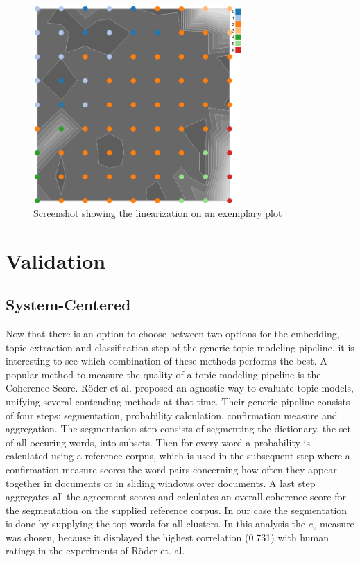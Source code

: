 \begin{figure}[t]
	\centering
	\includegraphics[width=300px]{../chapters/validation/pics/linearization}
	\caption{\label{pic:linearization} Screenshot showing the linearization on an exemplary plot}
\end{figure}

\section{Validation}

\subsection{System-Centered}

Now that there is an option to choose between two options for the embedding, topic extraction and classification step of the generic topic modeling pipeline, it is interesting to see which combination of these methods performs the best. A popular method to measure the quality of a topic modeling pipeline is the Coherence Score. Röder et al.\cite{roderExploringSpaceTopic2015a} proposed an agnostic way to evaluate topic models, unifying several contending methods at that time. Their generic pipeline consists of four steps: segmentation, probability calculation, confirmation measure and aggregation. The segmentation step consists of segmenting the dictionary, the set of all occuring words, into subsets. Then for every word a probability is calculated using a reference corpus, which is used in the subsequent step where a confirmation measure scores the word pairs concerning how often they appear together in documents or in sliding windows over documents. A last step aggregates all the agreement scores and calculates an overall coherence score for the segmentation on the supplied reference corpus. In our case the segmentation is done by supplying the top words for all clusters.  In this analysis the $c_v$ measure was chosen, because it displayed the highest correlation (0.731) with human ratings in the experiments of Röder et. al.


